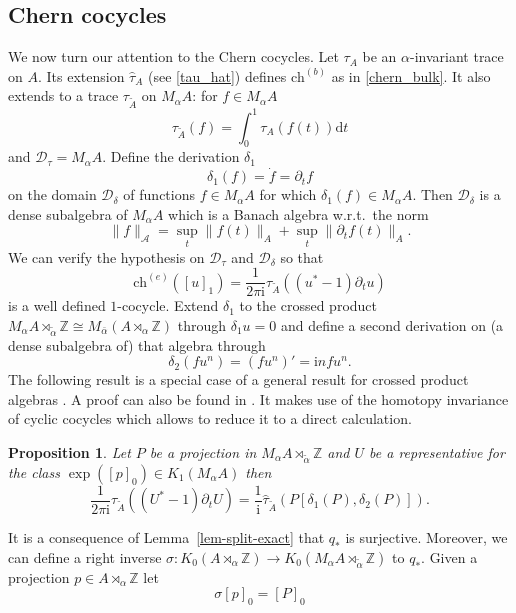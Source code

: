 \documentclass[11pt]{amsart}
\newtheorem{prop}{Proposition}[section]
\newcommand{\Z}{\mathbb{Z}}
\newcommand{\chb}{\text{ch}^{(b)}}
\newcommand{\che}{\text{ch}^{(e)}}
\begin{document}
\subsection{Chern cocycles}
We now turn our attention to the Chern cocycles. Let $\tau_A$ be an $\alpha$-invariant trace on $A$. Its extension $\hat{\tau}_A$ (see \eqref{tau_hat}) defines $\chb$ as in \eqref{chern_bulk}. 
It also extends to 
a trace $\tau_{\tilde{A}}$ on $M_\alpha A$:  for $f\in M_\alpha A$
$$\tau_{\tilde{A}}(f)=\int_0^1 \tau_A(f(t))\mathrm{d}t$$
and $\mathcal{D}_\tau=M_\alpha A$. Define the derivation $\delta_1$  
$$\delta_1(f)=\dot f  =\partial_t f$$
on the domain $\mathcal{D}_\delta $ of functions $f \in M_\alpha A$ for which $\delta_1(f)\in M_\alpha A$. Then $\mathcal{D}_\delta $ is a dense subalgebra of $M_\alpha A$ which is a Banach algebra w.r.t.\ the norm
$$\lVert f\rVert_\mathcal{A}= \sup_t \lVert f(t)\rVert_A+ \sup_t \lVert \partial_t f(t)\rVert_A.$$
We can verify the hypothesis on $\mathcal{D}_\tau$ and $\mathcal{D}_\delta$ so that
$$ \che([u]_1)= \frac{1}{2\pi\mathrm{i}}\tau_{\tilde{A}}((u^*-1)\partial_t u)  $$
is a well defined $1$-cocycle. Extend $\delta_1$ to the crossed product $M_\alpha A\rtimes_{\tilde\alpha}\Z\cong M_{\bar{\alpha}}(A \rtimes_\alpha \mathbb{Z})$ through $\delta_1 u = 0$ and define a second derivation on (a dense subalgebra of) that algebra through
	$$\delta_2(fu^n)= (fu^n)' = \mathrm{i}nfu^n.$$
The following result is a special case of a general result for crossed product algebras \cite{nest1988cyclic,elliott1988cyclic}. A proof can also be found in \cite{KelRichBal,prodan2016bulk}. It makes use of the homotopy invariance of cyclic cocycles which allows to reduce it to a direct calculation.
\begin{prop}\label{prop-ENN}
Let $P$ be a projection in $M_\alpha A\rtimes_{\tilde\alpha}\Z$ and $U$ be a representative for the class $\exp([p]_0)\in K_1(M_\alpha A)$ then
	\begin{equation}\label{winding_number_b}
	\frac{1}{2\pi\mathrm{i}}\tau_{\tilde{A}}((U^*-1)\partial_t U) 
=\frac1{\mathrm{i}}\hat{\tau}_{\tilde{A}}(P[\delta_1(P), \delta_2(P)]).
	\end{equation}
\end{prop}
\renewcommand{\sc}{\sigma}
It is a consequence of Lemma~\ref{lem-split-exact} that $q_*$ is surjective. Moreover, we can define a right inverse $\sc:K_0(A\rtimes_\alpha \Z)\to K_0(M_\alpha A\rtimes_{\tilde\alpha}\Z)$ to $q_*$. Given a projection $p\in A \rtimes_\alpha \mathbb{Z}$ let 
\begin{equation}\label{eq-sc}
\sc[p]_0 = [P]_0
\end{equation} 
\end{document}
